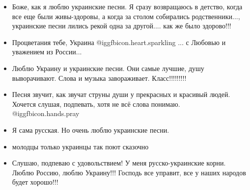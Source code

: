 \begin{itemize} %
\item Боже, как я люблю украинские песни. Я сразу возвращаюсь в детство, когда все
еще были живы-здоровы, а когда за столом собирались родственники..., украинские
песни лились рекой одна за другой.... как же было здорово!!!

\item Процветания тебе, Украина  @igg{fbicon.heart.sparkling} ... с Любовью и
уважением из России...

\item Люблю Украину и украинские песни. Они самые лучшие, душу выворачивают. Слова и
музыка завораживает. Класс!!!!!!!!!

\item Песня звучит, как звучат струны души у прекрасных и красивый людей. Хочется
слушая, подпевать, хотя  не  всё слова понимаю.  @igg{fbicon.hands.pray} 

\item Я сама русская. Но очень люблю украинские песни.

\item молодцы только украинцы так поют сказочно

\item Слушаю, подпеваю с удовольствием! У меня русско-украинские корни. Люблю Россию,
люблю Украину!!! Господь все управит, все у наших народов будет хорошо!!!
\end{itemize} %
